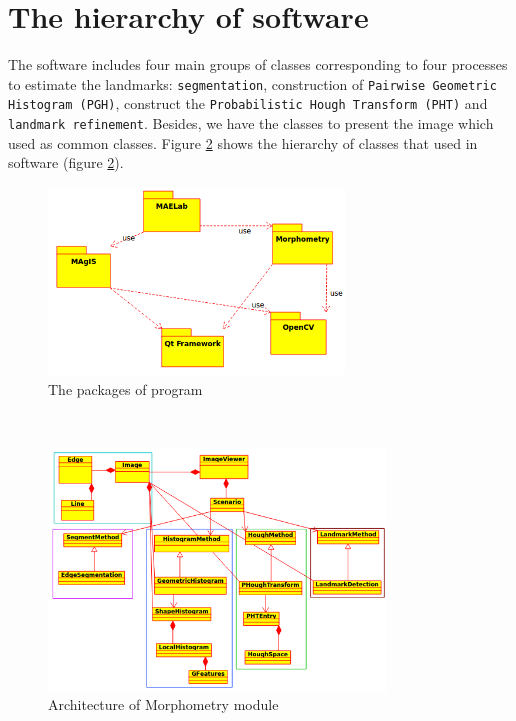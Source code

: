 \section{The hierarchy of software}
The software includes four main groups of classes corresponding to four processes to estimate the landmarks: \texttt{segmentation}, construction of \texttt{Pairwise Geometric Histogram (PGH)},  construct the \texttt{Probabilistic Hough Transform (PHT)} and \texttt{landmark refinement}. Besides, we have the classes to present the image which used as common classes. Figure \ref{fig:41} shows the hierarchy of classes that used in software (figure \ref{fig:41}).\\
\begin{figure}[h!]
\centering
\includegraphics[width=0.7\textwidth]{./images/packages}
\caption{The packages of program}
\label{fig:42}
\end{figure}~\\
\begin{figure}[h!]
\centering
\includegraphics[width=0.8\textwidth]{./images/modules}
\caption{Architecture of Morphometry module}
\label{fig:41}
\end{figure}
